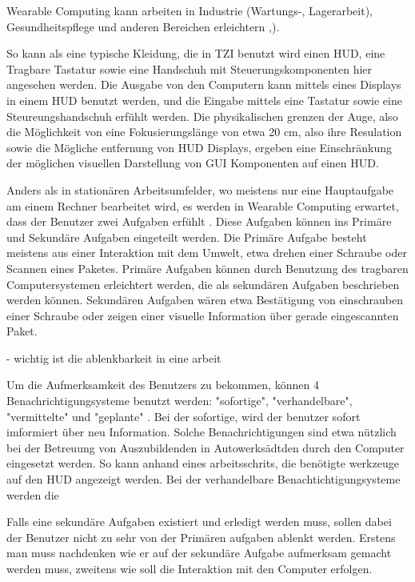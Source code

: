 Wearable Computing kann arbeiten in Industrie (Wartungs-, Lagerarbeit), Gesundheitspflege und anderen Bereichen erleichtern \cite{Witt:2006hi},\cite{Lawo:2008gg}). 



So kann als eine typische Kleidung, die in TZI benutzt wird einen HUD, eine Tragbare Tastatur sowie eine Handschuh mit Steuerungskomponenten hier angesehen werden. Die Ausgabe von den Computern kann mittels eines Displays in einem HUD benutzt werden, und die Eingabe mittels eine Tastatur sowie eine Steureungshandschuh erfühlt werden. Die physikalischen grenzen der Auge, also die Möglichkeit von eine Fokusierungslänge von etwa 20 cm, also ihre Resulation sowie die Mögliche entfernung von HUD Displays, ergeben eine Einschränkung der möglichen visuellen Darstellung von GUI Komponenten auf einen HUD. 

Anders als in stationären Arbeitsumfelder, wo meistens nur eine Hauptaufgabe am einem Rechner bearbeitet wird, es werden in Wearable Computing erwartet, dass der Benutzer zwei Aufgaben erfühlt \cite{Witt:2006hi}. Diese Aufgaben können ins Primäre und Sekundäre Aufgaben eingeteilt werden. Die Primäre Aufgabe besteht meistens aus einer Interaktion mit dem Umwelt, etwa drehen einer Schraube oder Scannen eines Paketes. Primäre Aufgaben können durch Benutzung des tragbaren Computersystemen erleichtert werden, die als sekundären Aufgaben beschrieben werden können. Sekundären Aufgaben wären etwa Bestätigung von einschrauben einer Schraube oder zeigen einer visuelle Information über gerade eingescannten Paket. 

- wichtig ist die ablenkbarkeit in eine arbeit

Um die Aufmerksamkeit des Benutzers zu bekommen, können 4 Benachrichtigungsysteme benutzt werden: "sofortige", "verhandelbare", "vermittelte" und "geplante" \cite{McFarlane:1999um}. Bei der sofortige, wird der benutzer sofort imformiert über neu Information. Solche Benachrichtigungen sind etwa nützlich bei der Betreuung von Auszubildenden in Autowerksädtden durch den Computer eingesetzt werden. So kann anhand eines arbeitsschrits, die benötigte werkzeuge auf den HUD angezeigt werden. Bei der verhandelbare Benachtichtigungsysteme werden die 

Falls eine sekundäre Aufgaben existiert und erledigt werden muss, sollen dabei der Benutzer nicht zu sehr von der Primären aufgaben ablenkt werden. Erstens man muss nachdenken wie er auf der sekundäre Aufgabe aufmerksam gemacht werden muss, zweitens wie soll die Interaktion mit den Computer erfolgen. 





